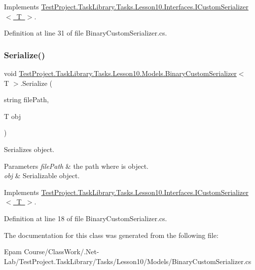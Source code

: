 Implements \mbox{\hyperlink{interface_test_project_1_1_task_library_1_1_tasks_1_1_lesson10_1_1_interfaces_1_1_i_custom_serializer}{Test\+Project.\+Task\+Library.\+Tasks.\+Lesson10.\+Interfaces.\+I\+Custom\+Serializer$<$ T $>$}}.



Definition at line 31 of file Binary\+Custom\+Serializer.\+cs.

\mbox{\label{class_test_project_1_1_task_library_1_1_tasks_1_1_lesson10_1_1_models_1_1_binary_custom_serializer_a2ba6d10308232409fb1e0c0ee804c227}} 
\subsubsection{\texorpdfstring{Serialize()}{Serialize()}}
{\footnotesize\ttfamily void \mbox{\hyperlink{class_test_project_1_1_task_library_1_1_tasks_1_1_lesson10_1_1_models_1_1_binary_custom_serializer}{Test\+Project.\+Task\+Library.\+Tasks.\+Lesson10.\+Models.\+Binary\+Custom\+Serializer}}$<$ T $>$.Serialize (\begin{DoxyParamCaption}\item[{string}]{file\+Path,  }\item[{T}]{obj }\end{DoxyParamCaption})}



Serializes object. 


\begin{DoxyParams}{Parameters}
{\em file\+Path} & the path where is object.\\
\hline
{\em obj} & Serializable object.\\
\hline
\end{DoxyParams}


Implements \mbox{\hyperlink{interface_test_project_1_1_task_library_1_1_tasks_1_1_lesson10_1_1_interfaces_1_1_i_custom_serializer}{Test\+Project.\+Task\+Library.\+Tasks.\+Lesson10.\+Interfaces.\+I\+Custom\+Serializer$<$ T $>$}}.



Definition at line 18 of file Binary\+Custom\+Serializer.\+cs.



The documentation for this class was generated from the following file\+:\begin{DoxyCompactItemize}
\item 
Epam Course/\+Class\+Work/.\+Net-\/\+Lab/\+Test\+Project.\+Task\+Library/\+Tasks/\+Lesson10/\+Models/Binary\+Custom\+Serializer.\+cs\end{DoxyCompactItemize}
